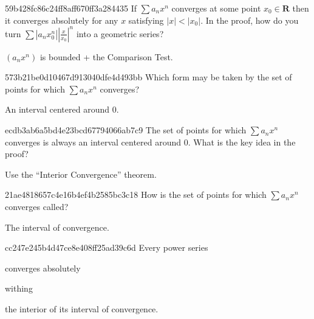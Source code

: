 \begin{note}{59b428fc86c24ff8aff670ff3a284435}
    If \({ \sum a_n x^{n} }\) converges at some point \({ x_0 \in \mathbf{R} }\) then it converges absolutely for any \({ x }\) satisfying \({ \left\lvert x \right\rvert < \left\lvert x_0 \right\rvert }\).
    In the proof, how do you turn \({ \sum \left\lvert a_n x_0^{n} \right\rvert \left\lvert \frac{x}{x_0} \right\rvert^{n} }\) into a geometric series?

    \begin{cloze}{1}
        \({ (a_n x^{n}) }\) is bounded + the Comparison Test.
    \end{cloze}
\end{note}

\begin{note}{573b21be0d10467d913040dfe4d493bb}
    Which form may be taken by the set of points for which \({ \sum a_n x^{n} }\) converges?

    \begin{cloze}{1}
        An interval centered around \({ 0 }\).
    \end{cloze}
\end{note}

\begin{note}{ecdb3ab6a5bd4e23bcd67794066ab7c9}
    The set of points for which \({ \sum a_n x^{n} }\) converges is always an interval centered around \({ 0 }\).
    What is the key idea in the proof?

    \begin{cloze}{1}
        Use the ``Interior Convergence'' theorem.
    \end{cloze}
\end{note}

\begin{note}{21ae4818657c4e16b4ef4b2585bc3c18}
    How is the set of points for which \({ \sum a_n x^{n} }\) converges called?

    \begin{cloze}{1}
        The interval of convergence.
    \end{cloze}
\end{note}

\begin{note}{cc247e245b4d47ce8e408ff25ad39c6d}
    Every power series \begin{icloze}{1}converges absolutely\end{icloze} withing \begin{icloze}{2}the interior of its interval of convergence.\end{icloze}
\end{note}

